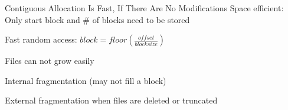   \begin{frame}{Contiguous Allocation Is Fast, If There Are No Modifications}
    Space efficient: Only start block and \# of blocks need to be stored

    \vspace{2em}

    Fast random access: $block = floor(\frac{offset}{blocksize})$

    \vspace{2em}
    Files can not grow easily

    \hspace{2em} Internal fragmentation (may not fill a block)
    
    \hspace{2em} External fragmentation when files are deleted or truncated
  \end{frame}

